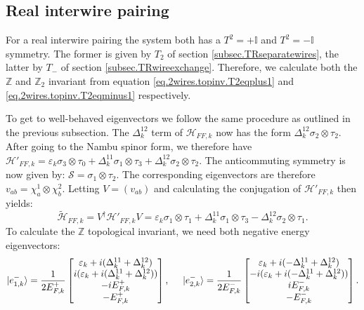 \subsection{Real interwire pairing}
\label{subsec.2wires_CSinv_Delta12real}
For a real interwire pairing the system both has a $T^2 = +\mathbb{I}$ and $T^2=-\mathbb{I}$ symmetry. The former is given by $T_2$ of section \ref{subsec.TRseparatewires}, the latter by $T_-$ of section \ref{subsec.TRwireexchange}. Therefore, we calculate both the $\mathbb{Z}$ and $\mathbb{Z}_2$ invariant from equation \eqref{eq.2wires.topinv.T2eqplus1} and \eqref{eq.2wires.topinv.T2eqminus1} respectively.

To get to well-behaved eigenvectors we follow the same procedure as outlined in the previous subsection. The $\Delta^{12}_k$ term of $\mathcal{H}_{FF,k}$ now has the form $\Delta^{12}_k \sigma_2 \otimes \tau_2$. After going to the Nambu spinor form, we therefore have $\mathcal{H}'_{FF,k} = \varepsilon_k \sigma_3 \otimes \tau_0 + \Delta^{11}_k \sigma_1 \otimes \tau_3 + \Delta^{12}_k \sigma_2 \otimes \tau_2$. The anticommuting symmetry is now given by: $\mathcal{S} = \sigma_1\otimes \tau_2$. The corresponding eigenvectors are therefore $v_{ab} = \chi^{1}_a\otimes\chi^{2}_b$. Letting $V = (v_{ab})$ and calculating the conjugation of $\mathcal{H}'_{FF,k}$ then yields:
\begin{equation}
\tilde{\mathcal{H}}_{FF,k} = V^\dagger\mathcal{H}'_{FF,k}V = \varepsilon_k \sigma_1\otimes \tau_1 + \Delta^{11}_k \sigma_1\otimes\tau_3 - \Delta^{12}_k\sigma_2\otimes\tau_1. \nonumber 
\end{equation}
To calculate the $\mathbb{Z}$ topological invariant, we need both negative energy eigenvectors:
\begin{equation}
\ket{e^{-}_{1,k}} = \frac{1}{2E^{+}_{F,k}}\begin{bmatrix} \varepsilon_k + i(\Delta^{11}_k + \Delta^{12}_k) \\ i(\varepsilon_k + i(\Delta^{11}_k + \Delta^{12}_k)) \\ -iE^{+}_{F,k} \\ -E^{+}_{F,k} \end{bmatrix}, \hspace{0.5cm} \ket{e^{-}_{2,k}} = \frac{1}{2E^{-}_{F,k}}\begin{bmatrix} \varepsilon_k + i(-\Delta^{11}_k + \Delta^{12}_k) \\ -i(\varepsilon_k + i(-\Delta^{11}_k + \Delta^{12}_k)) \\ iE^{-}_{F,k} \\ -E^{-}_{F,k} \end{bmatrix}. \nonumber
\end{equation}
